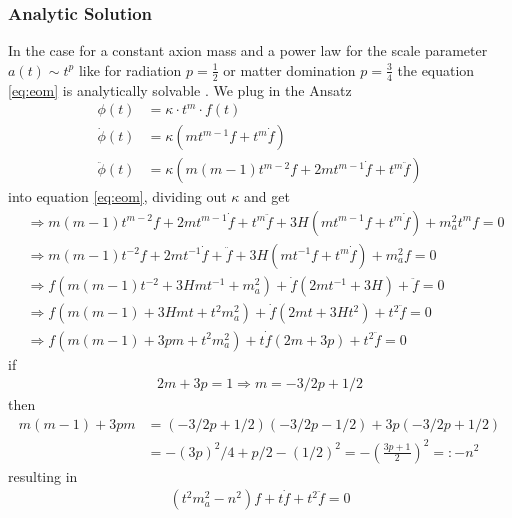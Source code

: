 \documentclass[a4paper]{article}
\begin{document}
\subsubsection{Analytic Solution}
In the case for a constant axion mass and
a power law for the scale parameter $a(t) \sim t^p$ like for radiation $p = \frac{1}{2}$
or matter domination $p = \frac{3}{4}$
the equation \ref{eq:eom} is analytically solvable \cite[Chap. 4.2, Page 25]{MarshAxionCosmo}.
We plug in the Ansatz
\begin{align*}
    \phi(t) &= \kappa \cdot t^m \cdot f(t) \\
    \dot{\phi}(t) &= \kappa \left( m t^{m - 1} f + t^m \dot{f} \right) \\
    \ddot{\phi}(t) &= \kappa \left( m (m - 1) t^{m - 2} f + 2 m t^{m - 1} \dot{f} + t^m \ddot{f} \right)
\end{align*}
into equation \ref{eq:eom}, dividing out $\kappa$ and get
\begin{align*}
    &\Rightarrow m (m - 1) t^{m - 2} f + 2 m t^{m - 1} \dot{f} + t^m \ddot{f} + 3H \left( m t^{m - 1} f + t^m \dot{f} \right) + m_a^2 t^m f = 0 \\
    &\Rightarrow m (m - 1) t^{- 2} f + 2 m t^{- 1} \dot{f} + \ddot{f} + 3H \left( m t^{- 1} f + t^m \dot{f} \right) + m_a^2 f = 0 \\
    &\Rightarrow f \left( m (m - 1) t^{-2} + 3H m t^{-1} + m_a^2 \right) + \dot{f} \left( 2mt^{-1} + 3 H \right) + \ddot{f} = 0 \\
    &\Rightarrow f \left( m (m - 1) + 3H m t + t^2 m_a^2 \right) + \dot{f} \left( 2mt + 3 H t^2 \right) + t^2 \ddot{f} = 0 \\
    &\Rightarrow f \left( m (m - 1) + 3pm + t^2 m_a^2 \right) + t \dot{f} \left( 2m + 3 p \right) + t^2 \ddot{f} = 0
\end{align*}
if
\begin{align*}
    2m + 3p = 1 \Rightarrow m = - 3 / 2 p + 1 / 2
\end{align*}
then
\begin{align*}
    m (m - 1) + 3pm &= (-3/2p + 1/2) (-3/2p - 1/2) + 3p(-3/2p + 1/2) \\
                    &= - (3p)^2 / 4 + p/2 - (1/2)^2 = - (\frac{3p + 1}{2})^2 =: -n^2
\end{align*}
resulting in
\begin{align*}
    (t^2 m_a^2 - n^2) f + t \dot{f} + t^2 \ddot{f} = 0
\end{align*}
\end{document}
